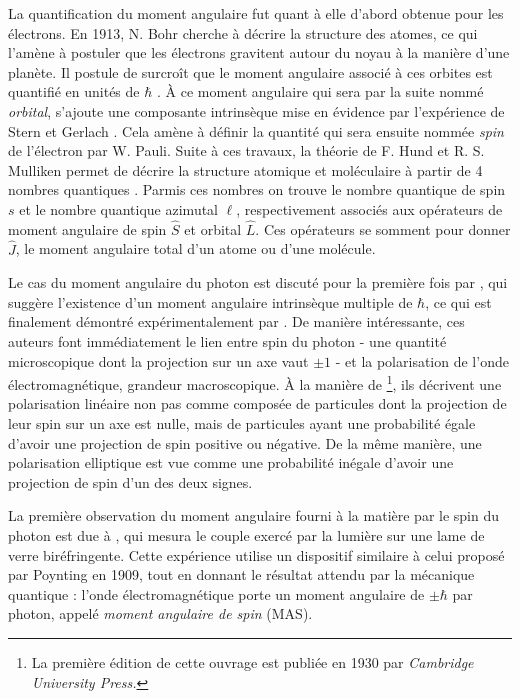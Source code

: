 La quantification du moment angulaire fut quant à elle d'abord obtenue pour les électrons. En 1913, N. Bohr cherche à décrire la structure des atomes, ce qui l'amène à postuler que les électrons gravitent autour du noyau à la manière d'une planète. Il postule de surcroît que le moment angulaire associé à ces orbites est quantifié en unités de $\hbar$ . \`A ce moment angulaire qui sera par la suite nommé \textit{orbital}, s'ajoute une composante intrinsèque mise en évidence par l'expérience de Stern et Gerlach . Cela amène  à définir la quantité qui sera ensuite nommée \textit{spin} de l'électron par W. Pauli. Suite à ces travaux, la théorie de F. Hund et R. S. Mulliken permet de décrire la structure atomique et moléculaire à partir de 4 nombres quantiques . Parmis ces nombres on trouve le nombre quantique de spin $s$ et le nombre quantique azimutal $\ell$, respectivement associés aux opérateurs de moment angulaire de spin $\hat{S}$ et orbital $\hat{L}$. Ces opérateurs se somment pour donner $\hat{J}$, le moment angulaire total d'un atome ou d'une molécule.

Le cas du moment angulaire du photon est discuté pour la première fois par , qui suggère l'existence d'un moment angulaire intrinsèque multiple de $\hbar$, ce qui est finalement démontré expérimentalement par . De manière intéressante, ces auteurs font immédiatement le lien entre spin du photon - une quantité microscopique dont la projection sur un axe vaut $\pm 1$ - et la polarisation de l'onde électromagnétique, grandeur macroscopique. \`A la manière de \footnote{La première édition de cette ouvrage est publiée en 1930 par \textit{Cambridge University Press.}}, ils décrivent une polarisation linéaire non pas comme composée de particules dont la projection de leur spin sur un axe est nulle, mais de particules ayant une probabilité égale d'avoir une projection de spin positive ou négative. De la même manière, une polarisation elliptique est vue comme une probabilité inégale d'avoir une projection de spin d'un des deux signes.   

La première observation du moment angulaire fourni à la matière par le spin du photon est due à , qui mesura le couple exercé par la lumière sur une lame de verre biréfringente. Cette expérience utilise un dispositif similaire à celui proposé par Poynting en 1909, tout en donnant le résultat attendu par la mécanique quantique : l'onde électromagnétique porte un moment angulaire de $\pm\hbar$ par photon, appelé \textit{moment angulaire de spin} (MAS).

